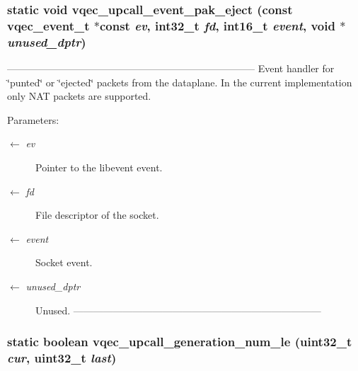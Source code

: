 \subsubsection{\setlength{\rightskip}{0pt plus 5cm}static void vqec\_\-upcall\_\-event\_\-pak\_\-eject (const vqec\_\-event\_\-t $\ast$const  {\em ev}, int32\_\-t {\em fd}, int16\_\-t {\em event}, void $\ast$ {\em unused\_\-dptr})\hspace{0.3cm}{\tt  [static]}}\label{vqec__upcall__event_8c_5c919a4bc80e0344385edb9a63653850}


--------------------------------------------------------------------------- Event handler for \char`\"{}punted\char`\"{} or \char`\"{}ejected\char`\"{} packets from the dataplane. In the current implementation only NAT packets are supported.

\begin{Desc}
\item[Parameters:]
\begin{description}
\item[\mbox{$\leftarrow$} {\em ev}]Pointer to the libevent event. \item[\mbox{$\leftarrow$} {\em fd}]File descriptor of the socket. \item[\mbox{$\leftarrow$} {\em event}]Socket event. \item[\mbox{$\leftarrow$} {\em unused\_\-dptr}]Unused. --------------------------------------------------------------------------- \end{description}
\end{Desc}
\subsubsection{\setlength{\rightskip}{0pt plus 5cm}static boolean vqec\_\-upcall\_\-generation\_\-num\_\-le (uint32\_\-t {\em cur}, uint32\_\-t {\em last})\hspace{0.3cm}{\tt  [inline, static]}}\label{vqec__upcall__event_8c_8dcef1adeb6f7c926620a5d0317eef82}


